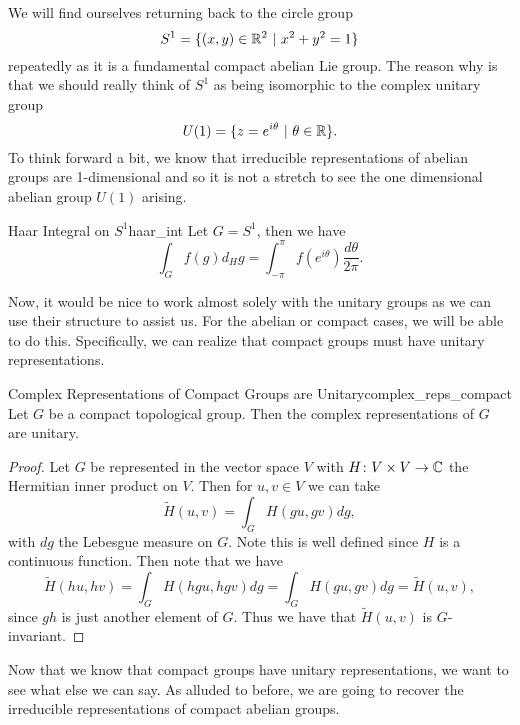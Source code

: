 We will find ourselves returning back to the circle group 
\[
S^1=\{ (x,y)\in \mathbb{R}^2 ~\vert~ x^2+y^2=1\}
\]
repeatedly as it is a fundamental compact abelian Lie group. The reason why is that we should really think of $S^1$ as being isomorphic to the complex unitary group
\[
U(1) = \{z=e^{i\theta}~\vert~\theta \in \mathbb{R}\}.
\]
To think forward a bit, we know that irreducible representations of abelian groups are 1-dimensional and so it is not a stretch to see the one dimensional abelian group $U(1)$ arising.

\begin{ex}{Haar Integral on $S^1$}{haar_int}
Let $G=S^1 $, then we have
\[
\int_G f(g)d_Hg = \int_{-\pi}^\pi f\left( e^{i\theta}\right)\frac{d\theta}{2\pi}.
\]
\end{ex}

Now, it would be nice to work almost solely with the unitary groups as we can use their structure to assist us.  For the abelian or compact cases, we will be able to do this. Specifically, we can realize that compact groups must have unitary representations.

\begin{thm}{Complex Representations of Compact Groups are Unitary}{complex_reps_compact}
    Let $G$ be a compact topological group. Then the complex representations of $G$ are unitary. 
    \tcblower
    \begin{proof}
    Let $G$ be represented in the vector space $V$ with $H\colon V\times V \to \mathbb{C}$ the Hermitian inner product on $V$. Then for $u,v\in V$ we can take
    \[
    \tilde{H}(u,v)=\int_G H(gu,gv)dg,
    \]
    with $dg$ the Lebesgue measure on $G$. Note this is well defined since $H$ is a continuous function. Then note that we have 
    \[
    \tilde{H}(hu,hv)=\int_G H(hgu,hgv)dg=\int_G H(gu,gv)dg=\tilde{H}(u,v),
    \]
    since $gh$ is just another element of $G$.  Thus we have that $\tilde{H}(u,v)$ is $G$-invariant.
    \end{proof}
\end{thm}

Now that we know that compact groups have unitary representations, we want to see what else we can say. As alluded to before, we are going to recover the irreducible representations of compact abelian groups.

